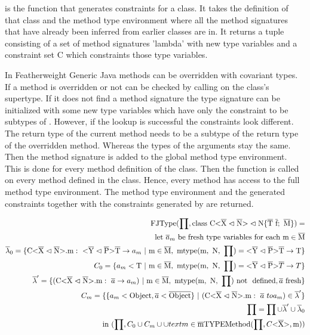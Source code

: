  is the function that generates constraints for a class. It takes the definition of that class and the method type environment where all the method signatures that have already been inferred from earlier classes are in.
It returns a tuple consisting of a set of method signatures 'lambda' with new type variables and a constraint set C which constraints those type variables.

In Featherweight Generic Java methods can be overridden with covariant types. If a method is overridden or not can be checked by calling  on the class's supertype.
If it does not find a method signature the type signature can be initialized with some new type variables which have only the constraint to be subtypes of .
However, if the  lookup is successful the constraints look different. The return type of the current method needs to be a subtype of the return type of the overridden method.
Whereas the types of the arguments stay the same. Then the method signature is added to the global method type environment.
This is done for every method definition of the class. Then the  function is called on every method defined in the class. Hence, every method has access to the full method type environment.
The method type environment and the generated constraints together with the constraints generated by  are returned.

\begin{align*}
    \text{FJType}(\prod, \classheader \{ \ot{T} \ \ot{f}; \ \ot{M} \}) = \\
    \text{let} \ \overline{a}_m \ \text{be fresh type variables for each m} \in \ot{M} \\
    \overline{\lambda}_0 = \{\cm : \ \yp \ot{T} \to a_m \ | \ \text{m} \in \ot{M}, \ \mtype = \yp \ot{T} \to \text{T} \}\\
    C_0 = \{ a_m < \text{T} \ | \ \text{m} \in \ot{M}, \ \mtype = \yp \oto{T} \}\\
    \overline{\lambda}' = \{ ( \cm : \ \overline{a} \to a_m ) \ | \ \text{m} \in \ot{M}, \ \mtype \ \text{not \ defined}, \fresh{\overline{a}} \}\\
    C_m = \{\{ a_m < \text{Object}, \overline{a} < \ot{Object} \} \ | \ ( \cm : \ \overline{a} \ to a_m) \in \overline{\lambda}' \} \\
    \prod = \prod \cup \overline{\lambda}' \cup \overline{\lambda}_0\\
    \text{in} \ (\prod, C_0 \cup C_m \cup \cup{text{m} \in \ot{m}} \text{TYPEMethod}(\prod, C \vv{\ot{X}}, \text{m}))\\
\end{align*}

